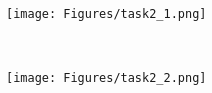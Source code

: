 \begin{figure*}[ht!]
 \centering
 \begin{minipage}[]{0.48\linewidth}
  \centering
 \texttt{[image: Figures/task2\_1.png]}
 \label{fig3} 
 \end{minipage}~~~~\begin{minipage}  []{0.48\linewidth}
  \centering
  \texttt{[image: Figures/task2\_2.png]}
  \label{fig4}
 \end{minipage}
\end{figure*}
